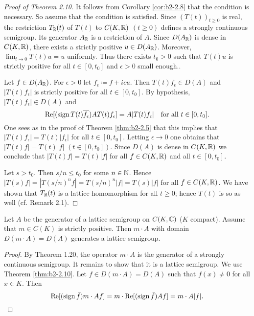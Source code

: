 \begin{proof}[Proof of Theorem 2.10]
It follows from  Corollary \ref{cor:b2-2.8} that the condition is necessary.
So assume that the condition is satisfied.
Since $(T(t))_{t \geq 0}$ is real, the restriction $T_{\mathbb{R}}(t)$ of $T(t)$ to $C(K,\mathbb{R})$ $(t \geq 0)$ defines a strongly continuous semigroup.
Its generator $A_{\mathbb{R}}$ is a restriction of $A$.
Since $D(A_{\mathbb{R}})$ is dense in $C(K,\mathbb{R})$, there exists a strictly positive $u \in D(A_{\mathbb{R}})$.
Moreover, $\lim_{t \to 0} T(t)u = u$ uniformly.
Thus there exists $t_{0} > 0$ such that $T(t)u$ is strictly positive for all $t \in [0,t_{0}]$ and $ \epsilon > 0 $ small enough..
 
Let $f \in D(A_{\mathbb{R}})$.
For $\epsilon > 0$ let $f_{\epsilon} \coloneqq f + i\epsilon u$.
Then $T(t)f_{\epsilon} \in D(A)$ and $|T(t)f_{\epsilon}|$ is strictly positive for all $t \in [0,t_{0}]$.
By hypothesis, $|T(t)f_{\epsilon}| \in D(A)$ and 
\[
\mathop{}\!\mathrm{Re}[(\operatorname{sign} T(t)\overline{f_{\epsilon}})AT(t)f_{\epsilon}] = A|T(t)f_{\epsilon}|
\quad \text{for all $t \in [0,t_{0}]$}.
\]
One sees as in the proof of Theorem \ref{thm:b2-2.5} that this implies that $|T(t)f_{\epsilon}| = T(t)|f_{\epsilon}|$ for all $t \in [0,t_{0}]$.
Letting $\epsilon \to 0$ one obtains that $|T(t)f| = T(t)|f|$ $(t \in [0,t_{0}])$.
Since $D(A)$ is dense in $C(K,\mathbb{R})$ we conclude that $|T(t)f| = T(t)|f|$ for all $f \in C(K,\mathbb{R})$ and all $t \in [0,t_{0}]$.

Let $s > t_{0}$.
Then $s/n \leq t_{0}$ for some $n \in \mathbb{N}$.
Hence $|T(s)f| = |T(s/n)^{n}f| = T(s/n)^{n}|f| = T(s)|f|$ for all $f \in C(K,\mathbb{R})$.
We have shown that $T_{\mathbb{R}}(t)$ is a lattice homomorphism for all $t \geq 0$; hence $T(t)$ is so as well (cf. Remark 2.1).
\end{proof}

\begin{corollary}\label{cor:b2-2.11}
Let $A$ be the generator of a lattice semigroup on $C(K,\mathbb{C})$ ($K$ compact).
Assume that  $m \in C(K)$ is strictly positive.
Then  $m \cdot A$ with domain $D(m \cdot A) = D(A)$ generates a lattice semigroup.
\end{corollary}

\begin{proof}
By Theorem 1.20, the operator  $m \cdot A$ is the generator of a strongly continuous semigroup.
It remains to show that it is a lattice semigroup.
We use Theorem \ref{thm:b2-2.10}.
Let $f \in D(m \cdot A) = D(A)$ such that $f(x) \neq 0$ for all $x \in K$.
Then 
\[
\mathop{}\!\mathrm{Re}[(\operatorname{sign} \bar{f})m \cdot Af] = m \cdot \mathop{}\!\mathrm{Re}[(\operatorname{sign} \bar{f})Af] = m \cdot A|f|.
\]
\end{proof}

